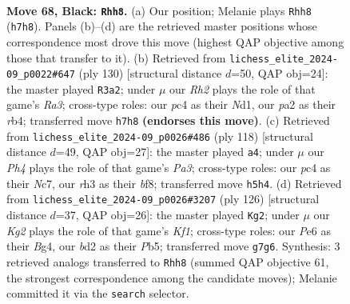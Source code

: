 \documentclass[11pt]{article}
\begin{document}
\clearpage

\begin{figure}[p]\centering
\begin{subfigure}{0.46\textwidth}\centering
\resizebox{\linewidth}{!}{%
\newchessgame
\chessboard[
  setfen={1r6/pn4kr/1p2p3/4P2p/2P5/1K4PR/P1NB1R2/8 b - - 8 68},
  showmover=false,
  pgfstyle=straightmove, color=movearrow, markmove={h7-h8}
]}
\caption{}
\end{subfigure}\hfill
\begin{subfigure}{0.46\textwidth}\centering
\resizebox{\linewidth}{!}{%
\newchessgame
\chessboard[
  setfen={r7/P7/1kp3p1/5bP1/1r5p/R7/5P1K/R2N4 w - - 10 66},
  showmover=false,
  pgfstyle=straightmove, color=movearrow, markmove={a3-a2}
]}
\caption{}
\end{subfigure}
\\[4pt]
\begin{subfigure}{0.46\textwidth}\centering
\resizebox{\linewidth}{!}{%
\newchessgame
\chessboard[
  setfen={5bk1/1pN3p1/1p4Pp/8/5P2/P3r1P1/2R3K1/8 w - - 3 60},
  showmover=false,
  pgfstyle=straightmove, color=movearrow, markmove={a3-a4}
]}
\caption{}
\end{subfigure}\hfill
\begin{subfigure}{0.46\textwidth}\centering
\resizebox{\linewidth}{!}{%
\newchessgame
\chessboard[
  setfen={5r2/6pk/6p1/1P1nr3/4p1B1/4P3/5P1P/1RR2K2 w - - 25 64},
  showmover=false,
  pgfstyle=straightmove, color=movearrow, markmove={f1-g2}
]}
\caption{}
\end{subfigure}
\caption{\textbf{Move 68, Black: \texttt{Rhh8}.} (a) Our position; Melanie plays \texttt{Rhh8} (\texttt{h7h8}). Panels (b)--(d) are the retrieved master positions whose correspondence most drove this move (highest QAP objective among those that transfer to it). (b) Retrieved from \texttt{lichess\_elite\_2024-09\_p0022\#647} (ply 130) [structural distance $d$=50, QAP obj=24]: the master played \texttt{R3a2}; under $\mu$ our \emph{Rh2} plays the role of that game's \emph{Ra3}; cross-type roles: our \emph{p}c4 as their \emph{N}d1, our \emph{p}a2 as their \emph{r}b4; transferred move \texttt{h7h8} \textbf{(endorses this move)}. (c) Retrieved from \texttt{lichess\_elite\_2024-09\_p0026\#486} (ply 118) [structural distance $d$=49, QAP obj=27]: the master played \texttt{a4}; under $\mu$ our \emph{Ph4} plays the role of that game's \emph{Pa3}; cross-type roles: our \emph{p}c4 as their \emph{N}c7, our \emph{r}h3 as their \emph{b}f8; transferred move \texttt{h5h4}. (d) Retrieved from \texttt{lichess\_elite\_2024-09\_p0026\#3207} (ply 126) [structural distance $d$=37, QAP obj=26]: the master played \texttt{Kg2}; under $\mu$ our \emph{Kg2} plays the role of that game's \emph{Kf1}; cross-type roles: our \emph{P}e6 as their \emph{B}g4, our \emph{b}d2 as their \emph{P}b5; transferred move \texttt{g7g6}. Synthesis: 3 retrieved analogs transferred to \texttt{Rhh8} (summed QAP objective 61, the strongest correspondence among the candidate moves); Melanie committed it via the \texttt{search} selector.}
\label{fig:thought-m135}
\end{figure}
\end{document}
